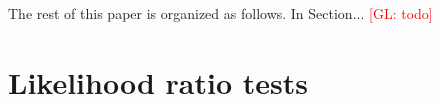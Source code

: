 \documentclass[12pt]{article}
\numberwithin{equation}{section}
\theoremstyle{plain}
\newcommand{\glnote}[1]{\textcolor{red}{[GL: #1]}}
\begin{document}
%

The rest of this paper is organized as follows. In Section... \glnote{todo}




\section{Likelihood ratio tests}
\label{sec:likelihood-ratio-tests}
\end{document}
